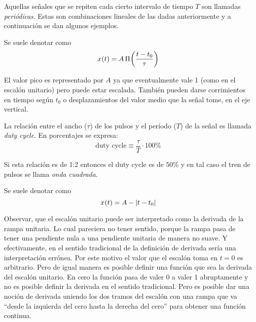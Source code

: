 \documentclass[a5paper,12pt,twoside]{book}
\begin{document}
Aquellas señales que se repiten cada cierto intervalo de tiempo $T$ son llamadas \emph{periódicas}. Estas son combinaciones lineales de las dadas anteriormente y a continuación se dan algunos ejemplos.


Se suele denotar como
\begin{equation*}
    \fx[x]{t} = A \, \fx[\Pi]{\frac{t-t_0}{\tau}}
\end{equation*}

\begin{center}
    \def\svgwidth{0.8\linewidth}
    
\end{center}

El valor pico es representado por $A$ ya que eventualmente vale 1 (como en el escalón unitario) pero puede estar escalada. También pueden darse corrimientos en tiempo según $t_0$ o desplazamientos del valor medio que la señal tome, en el eje vertical.

La relación entre el ancho ($\tau$) de los pulsos y el período ($T$) de la señal es llamada \emph{duty cycle}. En porcentajes se expresa:
\begin{equation*}
    \text{duty cycle}  \equiv \frac{\tau}{T} \cdot 100\%
\end{equation*}

Si esta relación es de 1:2 entonces el duty cycle es de $50\%$ y en tal caso el tren de pulsos se llama \emph{onda cuadrada}.


Se suele denotar como
\begin{equation*}
    \fx[x]{t} = A - \norm{t-t_0}
\end{equation*}

\begin{center}
    \def\svgwidth{0.8\linewidth}
    
\end{center}


\begin{center}
    \def\svgwidth{0.8\linewidth}
    
\end{center}

Observar, que el escalón unitario puede ser interpretado como la derivada de la rampa unitaria. Lo cual pareciera no tener sentido, porque la rampa pasa de tener una pendiente nula a una pendiente unitaria de manera no suave. Y efectivamente, en el sentido tradicional de la definición de derivada sería una interpretación errónea. Por este motivo el valor que el escalón toma en $t=0$ es arbitrario. Pero de igual manera es posible definir una función que sea la derivada del escalón unitario. En cero la función pasa de valer 0 a valer 1 abruptamente y no es posible definir la derivada en el sentido tradicional. Pero es posible dar una noción de derivada uniendo los dos tramos del escalón con una rampa que va ``desde la izquierda del cero hasta la derecha del cero'' para obtener una función continua.
\end{document}
